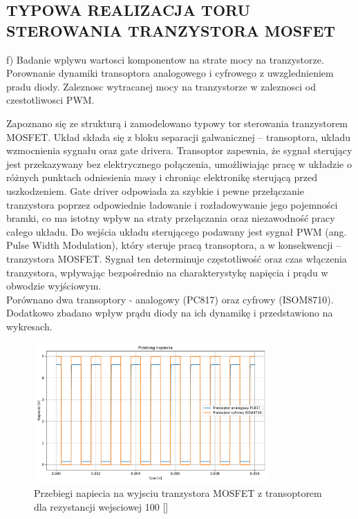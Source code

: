 \documentclass[11pt]{article}
\begin{document}
\subsection{TYPOWA REALIZACJA TORU STEROWANIA TRANZYSTORA MOSFET}

f) Badanie wplywu wartosci komponentow na strate mocy na tranzystorze. Porownanie dynamiki transoptora analogowego i cyfrowego z uwzglednieniem pradu diody. Zaleznosc wytracanej mocy na tranzystorze w zaleznosci od czestotliwosci PWM.

Zapoznano się ze strukturą i zamodelowano typowy tor sterowania tranzystorem MOSFET.
Układ składa się z bloku separacji galwanicznej – transoptora, układu wzmocnienia sygnału oraz gate drivera.
Transoptor zapewnia, że sygnał sterujący jest przekazywany bez elektrycznego połączenia, umożliwiając pracę w układzie o różnych punktach odniesienia masy i chroniąc elektronikę sterującą przed uszkodzeniem.
Gate driver odpowiada za szybkie i pewne przełączanie tranzystora poprzez odpowiednie ładowanie i rozładowywanie jego pojemności bramki, co ma istotny wpływ na straty przełączania oraz niezawodność pracy całego układu.
Do wejścia układu sterującego podawany jest sygnał PWM (ang. Pulse Width Modulation), który steruje pracą transoptora, a w konsekwencji – tranzystora MOSFET. Sygnał ten determinuje częstotliwość oraz czas włączenia tranzystora, wpływając bezpośrednio na charakterystykę napięcia i prądu w obwodzie wyjściowym.\\

Porównano dwa transoptory - analogowy (PC817) oraz cyfrowy (ISOM8710). 
Dodatkowo zbadano wpływ prądu diody na ich dynamikę i przedstawiono na wykresach.\\

\begin{figure}[H]
\centering
\includegraphics[width=0.8\textwidth]{aun1_gate_circuit_digital_vs_analog_rin100ohm.pdf}
\caption{Przebiegi napiecia na wyjsciu tranzystora MOSFET z transoptorem dla rezystancji wejsciowej 100 [\Omega]}
\end{figure}
\end{document}
